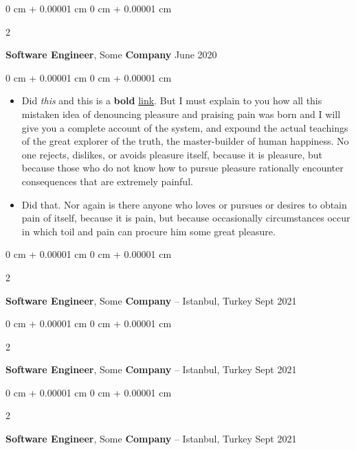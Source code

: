 \documentclass[10pt, letterpaper]{article}
\newenvironment{highlights}{
    \begin{itemize}[
        topsep=0.10 cm,
        parsep=0.10 cm,
        partopsep=0pt,
        itemsep=0pt,
        leftmargin=0 cm + 10pt
    ]
}{
    \end{itemize}
} %
\newenvironment{onecolentry}{
    \begin{adjustwidth}{
        0 cm + 0.00001 cm
    }{
        0 cm + 0.00001 cm
    }
}{
    \end{adjustwidth}
} %
\newenvironment{twocolentry}[2][]{
    \onecolentry
    \def\secondColumn{#2}
    \setcolumnwidth{\fill, 4.5 cm}
    \begin{paracol}{2}
}{
    \switchcolumn \raggedleft \secondColumn
    \end{paracol}
    \endonecolentry
} %
\begin{document}
        \vspace{0.2 cm}

        \begin{twocolentry}{
            June 2020
        }
            \textbf{Software Engineer}, Some \textbf{Company}\end{twocolentry}

        \vspace{0.10 cm}
        \begin{onecolentry}
            \begin{highlights}
                \item Did \textit{this} and this is a \textbf{bold} \href{https://example.com}{link}. But I must explain to you how all this mistaken idea of denouncing pleasure and praising pain was born and I will give you a complete account of the system, and expound the actual teachings of the great explorer of the truth, the master-builder of human happiness. No one rejects, dislikes, or avoids pleasure itself, because it is pleasure, but because those who do not know how to pursue pleasure rationally encounter consequences that are extremely painful.
                \item Did that. Nor again is there anyone who loves or pursues or desires to obtain pain of itself, because it is pain, but because occasionally circumstances occur in which toil and pain can procure him some great pleasure.
            \end{highlights}
        \end{onecolentry}


        \vspace{0.2 cm}

        \begin{twocolentry}{
            Sept 2021
        }
            \textbf{Software Engineer}, Some \textbf{Company} -- Istanbul, Turkey\end{twocolentry}



        \vspace{0.2 cm}

        \begin{twocolentry}{
            Sept 2021
        }
            \textbf{Software Engineer}, Some \textbf{Company} -- Istanbul, Turkey\end{twocolentry}



        \vspace{0.2 cm}

        \begin{twocolentry}{
            Sept 2021
        }
            \textbf{Software Engineer}, Some \textbf{Company} -- Istanbul, Turkey\end{twocolentry}
\end{document}

